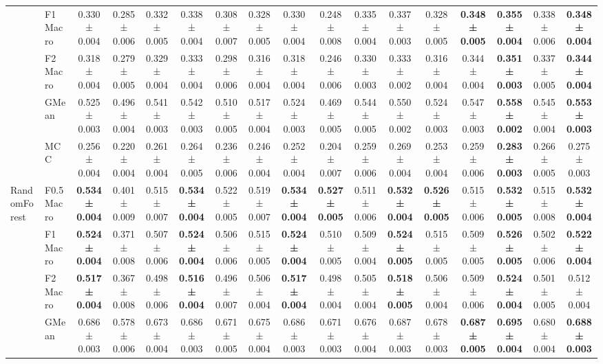 \begin{table}[H]
{\begin{tabular}{llccccccccccccccc}
 & F1 Macro & 0.330 ± 0.004 & 0.285 ± 0.006 & 0.332 ± 0.005 & 0.338 ± 0.004 & 0.308 ± 0.007 & 0.328 ± 0.005 & 0.330 ± 0.004 & 0.248 ± 0.008 & 0.335 ± 0.004 & 0.337 ± 0.003 & 0.328 ± 0.005 & \textbf{0.348 ± 0.005} & \textbf{0.355 ± 0.004} & 0.338 ± 0.006 & \textbf{0.348 ± 0.004} \\
 & F2 Macro & 0.318 ± 0.004 & 0.279 ± 0.005 & 0.329 ± 0.004 & 0.333 ± 0.004 & 0.298 ± 0.006 & 0.316 ± 0.004 & 0.318 ± 0.004 & 0.246 ± 0.006 & 0.330 ± 0.003 & 0.333 ± 0.002 & 0.316 ± 0.004 & 0.344 ± 0.004 & \textbf{0.351 ± 0.003} & 0.337 ± 0.005 & \textbf{0.344 ± 0.004} \\
 & GMean & 0.525 ± 0.003 & 0.496 ± 0.004 & 0.541 ± 0.003 & 0.542 ± 0.003 & 0.510 ± 0.005 & 0.517 ± 0.004 & 0.524 ± 0.003 & 0.469 ± 0.005 & 0.544 ± 0.005 & 0.550 ± 0.002 & 0.524 ± 0.003 & 0.547 ± 0.003 & \textbf{0.558 ± 0.002} & 0.545 ± 0.004 & \textbf{0.553 ± 0.003} \\
 & MCC & 0.256 ± 0.004 & 0.220 ± 0.004 & 0.261 ± 0.004 & 0.264 ± 0.005 & 0.236 ± 0.006 & 0.246 ± 0.004 & 0.252 ± 0.004 & 0.204 ± 0.007 & 0.259 ± 0.006 & 0.269 ± 0.004 & 0.253 ± 0.004 & 0.259 ± 0.006 & \textbf{0.283 ± 0.003} & 0.266 ± 0.005 & 0.275 ± 0.003 \\
\cline{1-17}
\multirow[t]{5}{*}{RandomForest} & F0.5 Macro & \textbf{0.534 ± 0.004} & 0.401 ± 0.009 & 0.515 ± 0.007 & \textbf{0.534 ± 0.004} & 0.522 ± 0.005 & 0.519 ± 0.007 & \textbf{0.534 ± 0.004} & \textbf{0.527 ± 0.005} & 0.511 ± 0.006 & \textbf{0.532 ± 0.004} & \textbf{0.526 ± 0.005} & 0.515 ± 0.006 & \textbf{0.532 ± 0.005} & 0.515 ± 0.008 & \textbf{0.532 ± 0.004} \\
 & F1 Macro & \textbf{0.524 ± 0.004} & 0.371 ± 0.008 & 0.507 ± 0.006 & \textbf{0.524 ± 0.004} & 0.506 ± 0.006 & 0.515 ± 0.005 & \textbf{0.524 ± 0.004} & 0.510 ± 0.005 & 0.509 ± 0.004 & \textbf{0.524 ± 0.005} & 0.515 ± 0.005 & 0.509 ± 0.005 & \textbf{0.526 ± 0.005} & 0.502 ± 0.006 & \textbf{0.522 ± 0.004} \\
 & F2 Macro & \textbf{0.517 ± 0.004} & 0.367 ± 0.008 & 0.498 ± 0.006 & \textbf{0.516 ± 0.004} & 0.496 ± 0.007 & 0.506 ± 0.004 & \textbf{0.517 ± 0.004} & 0.498 ± 0.004 & 0.505 ± 0.004 & \textbf{0.518 ± 0.005} & 0.506 ± 0.004 & 0.509 ± 0.006 & \textbf{0.524 ± 0.004} & 0.501 ± 0.005 & 0.512 ± 0.004 \\
 & GMean & 0.686 ± 0.003 & 0.578 ± 0.006 & 0.673 ± 0.004 & 0.686 ± 0.003 & 0.671 ± 0.005 & 0.675 ± 0.004 & 0.686 ± 0.003 & 0.671 ± 0.003 & 0.676 ± 0.004 & 0.687 ± 0.003 & 0.678 ± 0.003 & \textbf{0.687 ± 0.005} & \textbf{0.695 ± 0.004} & 0.680 ± 0.004 & \textbf{0.688 ± 0.003} \\

\end{tabular}}
\end{table}
